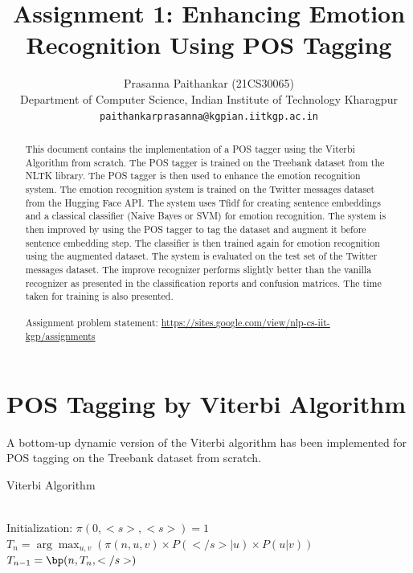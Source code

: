 \documentclass{article}
\title{Assignment 1: Enhancing Emotion Recognition Using POS Tagging}
\author{%
  Prasanna Paithankar (21CS30065)\\
  Department of Computer Science, Indian Institute of Technology Kharagpur\\
  \texttt{paithankarprasanna@kgpian.iitkgp.ac.in} \\
}
\begin{document}
\maketitle


\begin{abstract}
    This document contains the implementation of a POS tagger using the Viterbi Algorithm from scratch. The POS tagger is trained on the Treebank dataset from the NLTK library. The POS tagger is then used to enhance the emotion recognition system. The emotion recognition system is trained on the Twitter messages dataset from the Hugging Face API. The system uses Tfidf for creating sentence embeddings and a classical classifier (Naive Bayes or SVM) for emotion recognition. The system is then improved by using the POS tagger to tag the dataset and augment it before sentence embedding step. The classifier is then trained again for emotion recognition using the augmented dataset. The system is evaluated on the test set of the Twitter messages dataset. The improve recognizer performs slightly better than the vanilla recognizer as presented in the classification reports and confusion matrices. The time taken for training is also presented.\\
    \\
    Assignment problem statement: \url{https://sites.google.com/view/nlp-cs-iit-kgp/assignments}
\end{abstract}


\section{POS Tagging by Viterbi Algorithm}

A bottom-up dynamic version of the Viterbi algorithm has been implemented for POS tagging on the Treebank dataset from scratch.

\begin{algorithm}
\caption{Viterbi Algorithm}
\SetAlgoLined
{}
\texttt{\\}
Initialization: $\pi(0, <s>, <s>) = 1$\\
$T_n = \arg\max_{u, v}(\pi(n, u, v) \times P(</s>|u) \times P(u|v))$\\
$T_{n-1} = \bp(n, T_n, </s>)$\\
\end{algorithm}
\end{document}
